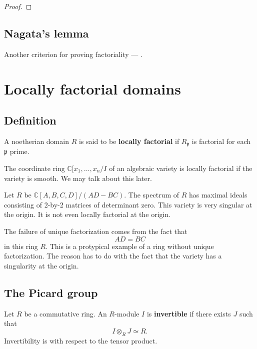 \begin{proof} 
\end{proof} 
\subsection{Nagata's lemma}

Another criterion for proving factoriality --- .




\section{Locally factorial domains}

\subsection{Definition}
\begin{definition} 
A noetherian domain $R$ is said to be \textbf{locally factorial} if
$R_{\mathfrak{p}}$ is factorial for each $\mathfrak{p}$ prime.
\end{definition} 

\begin{example} 
The coordinate ring $\mathbb{C}[x_1, \dots, x_n/I$ of an algebraic variety is
locally factorial if the variety is smooth. We may talk about this later. 
\end{example} 

\begin{example}[Nonexample]
Let $R$ be $\mathbb{C}[A,B,C,D]/(AD - BC)$. The spectrum of $R$ has maximal
ideals consisting of 2-by-2 matrices of determinant zero. This variety is very
singular at the origin. It is not even locally factorial at the origin.

The failure of unique factorization comes from the fact that
\[ AD = BC  \]
in this ring $R$. This is a protypical example of a ring without unique
factorization. The reason has to do with the fact that the variety has a
singularity at the origin. 
\end{example} 

\subsection{The Picard group}

\begin{definition} 
Let $R$ be a commutative ring. An $R$-module $I$ is \textbf{invertible} if
there exists $J$ such that
\[ I \otimes_R J \simeq R.  \]
Invertibility  is with respect to the tensor product.
\end{definition} 

